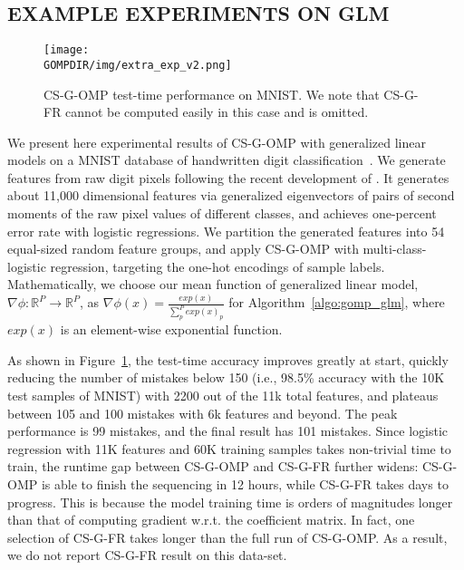 \subsection{EXAMPLE EXPERIMENTS ON GLM}

\begin{figure}[th!]
\centering
\texttt{[image: \\GOMPDIR/img/extra\_exp\_v2.png]}
\caption{CS-G-OMP test-time performance on MNIST. We note that CS-G-FR cannot be computed easily in this case and is omitted.} 
\label{fig:mnist}
\end{figure}
We present here experimental results of CS-G-OMP with generalized linear models on a MNIST database of handwritten digit classification~\citep{MNIST}.
We generate features from raw digit pixels following the recent development of \cite{gem}. It  generates about 11,000 dimensional features via generalized eigenvectors of pairs of second moments of the raw pixel values of different classes, and achieves one-percent error rate with logistic regressions. We partition the generated features into 54 equal-sized random feature groups, and apply CS-G-OMP with multi-class-logistic regression, targeting the one-hot encodings of sample labels. Mathematically, we choose our mean function of generalized linear model, $\nabla \phi: \mathbb{R}^P \rightarrow \mathbb{R}^P$, as 
$\nabla \phi(x) = \frac{exp(x)}{\sum _p^P exp(x)_p}$ for Algorithm~\ref{algo:gomp_glm}, where $exp(x)$ is an element-wise exponential function. 

As shown in Figure~\ref{fig:mnist}, the test-time accuracy improves greatly at start, quickly reducing the number of mistakes below 150 (i.e., 98.5\% accuracy with the 10K test samples of MNIST) with 2200 out of the 11k total features, and plateaus between 105 and 100 mistakes with 6k features and beyond. The peak performance is 99 mistakes, and the final result has 101 mistakes.  Since logistic regression with 11K features and 60K training samples takes non-trivial time to train, the runtime gap between CS-G-OMP and CS-G-FR further widens: CS-G-OMP is able to finish the sequencing in 12 hours, while CS-G-FR takes days to progress. This is because the model training time is orders of magnitudes longer than that of computing gradient w.r.t. the coefficient matrix. In fact, one selection of CS-G-FR takes longer than the full run of CS-G-OMP. As a result, we do not report CS-G-FR result on this data-set.




